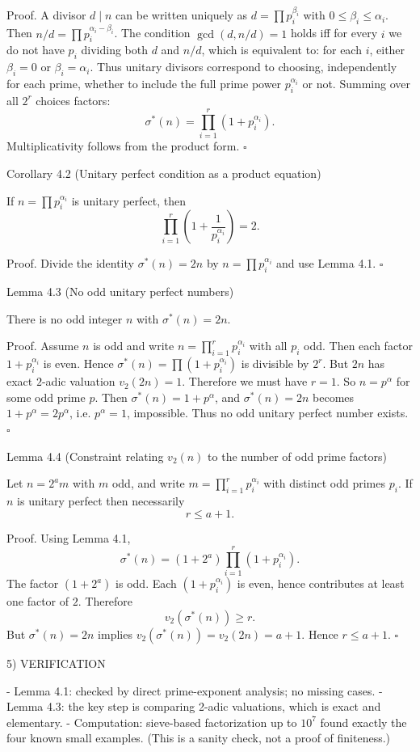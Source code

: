 Proof.
A divisor $d\mid n$ can be written uniquely as $d=\prod p_i^{\beta_i}$ with $0\le \beta_i\le \alpha_i$.
Then $n/d=\prod p_i^{\alpha_i-\beta_i}$.
The condition $\gcd(d,n/d)=1$ holds iff for every $i$ we do not have $p_i$ dividing both $d$ and $n/d$,
which is equivalent to: for each $i$, either $\beta_i=0$ or $\beta_i=\alpha_i$.
Thus unitary divisors correspond to choosing, independently for each prime, whether to include the full
prime power $p_i^{\alpha_i}$ or not.
Summing over all $2^r$ choices factors:
\[
  \sigma^*(n)=\prod_{i=1}^r (1+p_i^{\alpha_i}).
\]
Multiplicativity follows from the product form.
$\square$

Corollary 4.2 (Unitary perfect condition as a product equation)

If $n=\prod p_i^{\alpha_i}$ is unitary perfect, then
\[
  \prod_{i=1}^r \left(1+\frac{1}{p_i^{\alpha_i}}\right)=2.
\]

Proof.
Divide the identity $\sigma^*(n)=2n$ by $n=\prod p_i^{\alpha_i}$ and use Lemma 4.1.
$\square$

Lemma 4.3 (No odd unitary perfect numbers)

There is no odd integer $n$ with $\sigma^*(n)=2n$.

Proof.
Assume $n$ is odd and write $n=\prod_{i=1}^r p_i^{\alpha_i}$ with all $p_i$ odd.
Then each factor $1+p_i^{\alpha_i}$ is even.
Hence $\sigma^*(n)=\prod (1+p_i^{\alpha_i})$ is divisible by $2^r$.
But $2n$ has exact $2$-adic valuation $v_2(2n)=1$.
Therefore we must have $r=1$.
So $n=p^\alpha$ for some odd prime $p$.
Then $\sigma^*(n)=1+p^\alpha$, and $\sigma^*(n)=2n$ becomes
$1+p^\alpha = 2p^\alpha$, i.e. $p^\alpha=1$, impossible.
Thus no odd unitary perfect number exists.
$\square$

Lemma 4.4 (Constraint relating $v_2(n)$ to the number of odd prime factors)

Let $n=2^a m$ with $m$ odd, and write $m=\prod_{i=1}^r p_i^{\alpha_i}$ with distinct odd primes $p_i$.
If $n$ is unitary perfect then necessarily
\[
  r\le a+1.
\]

Proof.
Using Lemma 4.1,
\[
  \sigma^*(n)=(1+2^a)\prod_{i=1}^r (1+p_i^{\alpha_i}).
\]
The factor $(1+2^a)$ is odd.
Each $(1+p_i^{\alpha_i})$ is even, hence contributes at least one factor of $2$.
Therefore
\[
  v_2(\sigma^*(n))\ge r.
\]
But $\sigma^*(n)=2n$ implies $v_2(\sigma^*(n))=v_2(2n)=a+1$.
Hence $r\le a+1$.
$\square$

5) VERIFICATION

- Lemma 4.1: checked by direct prime-exponent analysis; no missing cases.
- Lemma 4.3: the key step is comparing 2-adic valuations, which is exact and elementary.
- Computation: sieve-based factorization up to $10^7$ found exactly the four known small examples.
  (This is a sanity check, not a proof of finiteness.)


